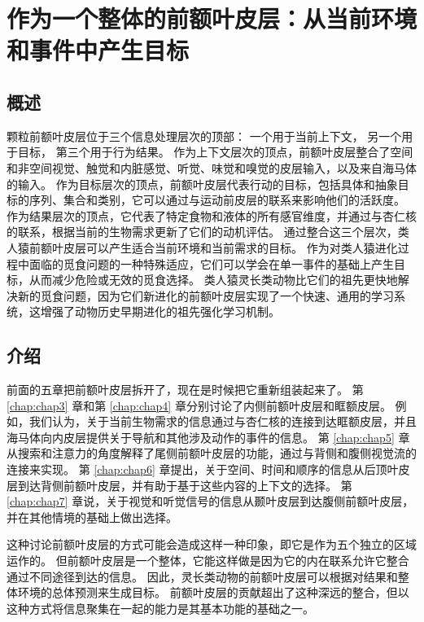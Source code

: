 \chapter{作为一个整体的前额叶皮层：从当前环境和事件中产生目标} \label{chap:chap8}

\section{概述}

颗粒前额叶皮层位于三个信息处理层次的顶部：
一个用于当前上下文，
另一个用于目标，
第三个用于行为结果。
作为上下文层次的顶点，前额叶皮层整合了空间和非空间视觉、触觉和内脏感觉、听觉、味觉和嗅觉的皮层输入，以及来自海马体的输入。
作为目标层次的顶点，前额叶皮层代表行动的目标，包括具体和抽象目标的序列、集合和类别，它可以通过与运动前皮层的联系来影响他们的活跃度。
作为结果层次的顶点，它代表了特定食物和液体的所有感官维度，并通过与杏仁核的联系，根据当前的生物需求更新了它们的动机评估。
通过整合这三个层次，类人猿前额叶皮层可以产生适合当前环境和当前需求的目标。
作为对类人猿进化过程中面临的觅食问题的一种特殊适应，它们可以学会在单一事件的基础上产生目标，从而减少危险或无效的觅食选择。
类人猿灵长类动物比它们的祖先更快地解决新的觅食问题，因为它们新进化的前额叶皮层实现了一个快速、通用的学习系统，这增强了动物历史早期进化的祖先强化学习机制。



\section{介绍}
\par

前面的五章把前额叶皮层拆开了，现在是时候把它重新组装起来了。
第 \ref{chap:chap3} 章和第 \ref{chap:chap4} 章分别讨论了内侧前额叶皮层和眶额皮层。
例如，我们认为，关于当前生物需求的信息通过与杏仁核的连接到达眶额皮层，并且海马体向内皮层提供关于导航和其他涉及动作的事件的信息。
第 \ref{chap:chap5} 章从搜索和注意力的角度解释了尾侧前额叶皮层的功能，通过与背侧和腹侧视觉流的连接来实现。
第 \ref{chap:chap6} 章提出，关于空间、时间和顺序的信息从后顶叶皮层到达背侧前额叶皮层，并有助于基于这些内容的上下文的选择。
第 \ref{chap:chap7} 章说，关于视觉和听觉信号的信息从颞叶皮层到达腹侧前额叶皮层，并在其他情境的基础上做出选择。
\par


这种讨论前额叶皮层的方式可能会造成这样一种印象，即它是作为五个独立的区域运作的。
但前额叶皮层是一个整体，它能这样做是因为它的内在联系允许它整合通过不同途径到达的信息。
因此，灵长类动物的前额叶皮层可以根据对结果和整体环境的总体预测来生成目标。
前额叶皮层的贡献超出了这种深远的整合，但以这种方式将信息聚集在一起的能力是其基本功能的基础之一。
\par


